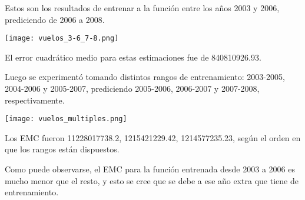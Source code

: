 Estos son los resultados de entrenar a la función entre los años 2003 y 2006, prediciendo de 2006 a 2008.

\texttt{[image: vuelos\_3-6\_7-8.png]}

El error cuadrático medio para estas estimaciones fue de 840810926.93.

Luego se experimentó tomando distintos rangos de entrenamiento: 2003-2005, 2004-2006 y 2005-2007, prediciendo 2005-2006, 2006-2007 y 2007-2008, respectivamente.

\texttt{[image: vuelos\_multiples.png]}

Los EMC fueron 11228017738.2, 1215421229.42, 1214577235.23, según el orden en que los rangos están dispuestos.

Como puede observarse, el EMC para la función entrenada desde 2003 a 2006 es mucho menor que el resto, y esto se cree que se debe a ese año extra que tiene de entrenamiento.
